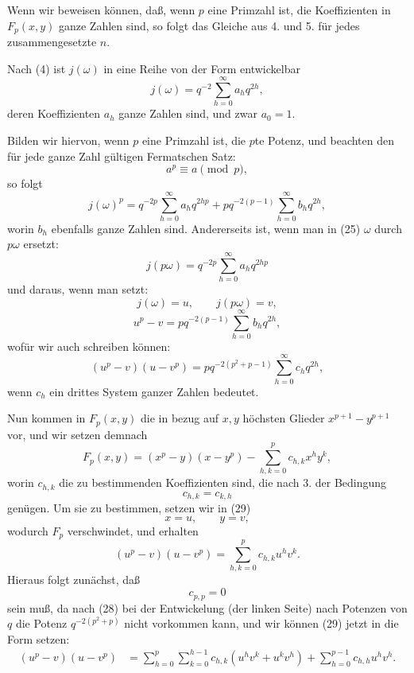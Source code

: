 \documentclass[11pt]{article}
\begin{document}
Wenn wir beweisen können, daß, wenn $p$ eine Primzahl ist, die Koeffizienten in
$F_p(x,y)$ ganze Zahlen sind, so folgt das Gleiche aus 4. und 5. für jedes zusammengesetzte
$n$.

Nach (4) ist $j(\omega)$ in eine Reihe von der Form entwickelbar
\begin{equation}
 j(\omega)=q^{-2}\sum_{h=0}^{\infty}a_hq^{2h},
\tag{25}
\end{equation}
deren Koeffizienten $a_h$ ganze Zahlen sind, und zwar $a_0=1$.

Bilden wir hiervon, wenn $p$ eine Primzahl ist, die $p$te Potenz, und beachten den für jede
ganze Zahl gültigen Fermatschen Satz:
\[
 a^p\equiv a\pmod p,
\]
so folgt
\begin{equation}
 j(\omega)^p=q^{-2p}\sum_{h=0}^{\infty}a_hq^{2hp}
 +p q^{-2(p-1)}\sum_{h=0}^{\infty}b_hq^{2h},
\tag{26}
\end{equation}
worin $b_h$ ebenfalls ganze Zahlen sind. Andererseits ist, wenn man in (25) $\omega$ durch
$p\omega$ ersetzt:
\begin{equation}
 j(p\omega)=q^{-2p}\sum_{h=0}^{\infty}a_hq^{2hp}
\tag{27}
\end{equation}
und daraus, wenn man setzt:
\[
 j(\omega)=u,
 \qquad j(p\omega)=v,
\]
\[
 u^p-v=pq^{-2(p-1)}\sum_{h=0}^{\infty}b_hq^{2h},
\]
wofür wir auch schreiben können:
\begin{equation}
 (u^p-v)(u-v^p)=p q^{-2(p^2+p-1)}\sum_{h=0}^{\infty}c_hq^{2h},
\tag{28}
\end{equation}
wenn $c_h$ ein drittes System ganzer Zahlen bedeutet.

Nun kommen in $F_p(x,y)$ die in bezug auf $x,y$ höchsten Glieder $x^{p+1}-y^{p+1}$ vor,
und wir setzen demnach
\begin{equation}
 F_p(x,y)=(x^p-y)(x-y^p)-\sum_{h,k=0}^{p}c_{h,k}x^hy^k,
\tag{29}
\end{equation}
worin $c_{h,k}$ die zu bestimmenden Koeffizienten sind, die nach 3. der Bedingung
\[
 c_{h,k}=c_{k,h}
\]
genügen. Um sie zu bestimmen, setzen wir in (29)
\[
 x=u,
 \qquad y=v,
\]
wodurch $F_p$ verschwindet, und erhalten
\begin{equation}
 (u^p-v)(u-v^p)=\sum_{h,k=0}^{p}c_{h,k}u^hv^k.
\tag{30}
\end{equation}
Hieraus folgt zunächst, daß
\[
 c_{p,p}=0
\]
sein muß, da nach (28) bei der Entwickelung (der linken Seite) nach Potenzen von $q$ die
Potenz $q^{-2(p^2+p)}$ nicht vorkommen kann, und wir können (29) jetzt in die Form setzen:
\begin{align}
 (u^p-v)(u-v^p)
 &=\sum_{h=0}^{p}\sum_{k=0}^{h-1}c_{h,k}(u^hv^k+u^kv^h)
 +\sum_{h=0}^{p-1}c_{h,h}u^hv^h.
\tag{31}
\end{align}
\end{document}
